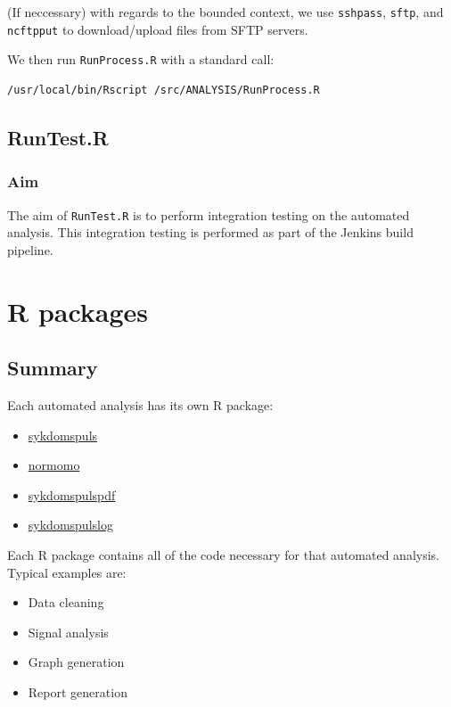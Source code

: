 \documentclass[12pt,]{article}
\providecommand{\tightlist}{%
  \setlength{\itemsep}{0pt}\setlength{\parskip}{0pt}}
\begin{document}
(If neccessary) with regards to the bounded context, we use
\texttt{sshpass}, \texttt{sftp}, and \texttt{ncftpput} to
download/upload files from SFTP servers.

We then run \texttt{RunProcess.R} with a standard call:

\begin{verbatim}
/usr/local/bin/Rscript /src/ANALYSIS/RunProcess.R
\end{verbatim}

\subsection{RunTest.R}\label{runtest.r}

\subsubsection{Aim}\label{aim-2}

The aim of \texttt{RunTest.R} is to perform integration testing on the
automated analysis. This integration testing is performed as part of the
Jenkins build pipeline.

\section{R packages}\label{r-packages}

\subsection{Summary}\label{summary-1}

Each automated analysis has its own R package:

\begin{itemize}
\tightlist
\item
  \href{https://folkehelseinstituttet.github.io/dashboards_sykdomspuls/}{sykdomspuls}
\item
  \href{https://folkehelseinstituttet.github.io/dashboards_normomo/}{normomo}
\item
  \href{https://folkehelseinstituttet.github.io/dashboards_sykdomspuls_pdf/}{sykdomspulspdf}
\item
  \href{https://folkehelseinstituttet.github.io/dashboards_sykdomspuls_log/}{sykdomspulslog}
\end{itemize}

Each R package contains all of the code necessary for that automated
analysis. Typical examples are:

\begin{itemize}
\tightlist
\item
  Data cleaning
\item
  Signal analysis
\item
  Graph generation
\item
  Report generation
\end{itemize}
\end{document}

